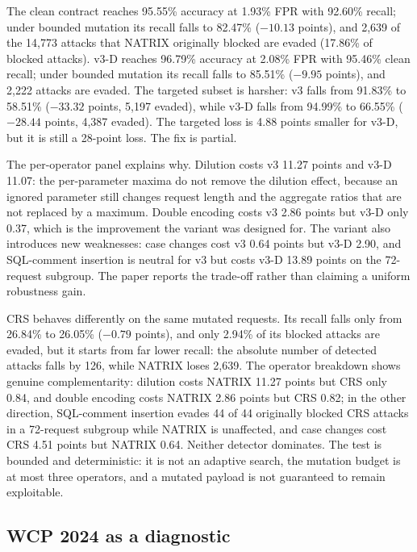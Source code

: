 \documentclass[preprint,11pt]{elsarticle}
\begin{document}
The clean contract reaches 95.55\% accuracy at 1.93\% FPR with 92.60\%
recall; under bounded mutation its recall falls to 82.47\% (\(-10.13\)
points), and 2,639 of the 14,773 attacks that NATRIX originally blocked
are evaded (17.86\% of blocked attacks). v3-D reaches 96.79\% accuracy
at 2.08\% FPR with 95.46\% clean recall; under bounded mutation its
recall falls to 85.51\% (\(-9.95\) points), and 2,222 attacks are
evaded. The targeted subset is harsher: v3 falls from 91.83\% to 58.51\%
(\(-33.32\) points, 5,197 evaded), while v3-D falls from 94.99\% to
66.55\% (\(-28.44\) points, 4,387 evaded). The targeted loss is 4.88
points smaller for v3-D, but it is still a 28-point loss. The fix is
partial.

The per-operator panel explains why. Dilution costs v3 11.27 points and
v3-D 11.07: the per-parameter maxima do not remove the dilution effect,
because an ignored parameter still changes request length and the
aggregate ratios that are not replaced by a maximum. Double encoding
costs v3 2.86 points but v3-D only 0.37, which is the improvement the
variant was designed for. The variant also introduces new weaknesses:
case changes cost v3 0.64 points but v3-D 2.90, and SQL-comment
insertion is neutral for v3 but costs v3-D 13.89 points on the
72-request subgroup. The paper reports the trade-off rather than
claiming a uniform robustness gain.

CRS behaves differently on the same mutated requests. Its recall falls
only from 26.84\% to 26.05\% (\(-0.79\) points), and only 2.94\% of its
blocked attacks are evaded, but it starts from far lower recall: the
absolute number of detected attacks falls by 126, while NATRIX loses
2,639. The operator breakdown shows genuine complementarity: dilution
costs NATRIX 11.27 points but CRS only 0.84, and double encoding costs
NATRIX 2.86 points but CRS 0.82; in the other direction, SQL-comment
insertion evades 44 of 44 originally blocked CRS attacks in a 72-request
subgroup while NATRIX is unaffected, and case changes cost CRS 4.51
points but NATRIX 0.64. Neither detector dominates. The test is bounded
and deterministic: it is not an adaptive search, the mutation budget is
at most three operators, and a mutated payload is not guaranteed to
remain exploitable.

\subsection{WCP 2024 as a diagnostic}\label{wcp-2024-as-a-diagnostic}
\end{document}
